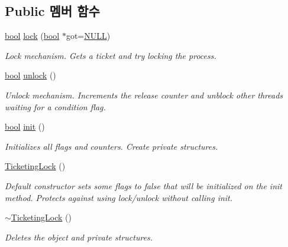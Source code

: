\subsection*{Public 멤버 함수}
\begin{DoxyCompactItemize}
\item 
\hyperlink{avb__gptp_8h_af6a258d8f3ee5206d682d799316314b1}{bool} \hyperlink{class_ticketing_lock_a27addfbd7031de7dc72d73e9e89449bd}{lock} (\hyperlink{avb__gptp_8h_af6a258d8f3ee5206d682d799316314b1}{bool} $\ast$got=\hyperlink{openavb__types__base__pub_8h_a070d2ce7b6bb7e5c05602aa8c308d0c4}{N\+U\+LL})
\begin{DoxyCompactList}\small\item\em Lock mechanism. Gets a ticket and try locking the process. \end{DoxyCompactList}\item 
\hyperlink{avb__gptp_8h_af6a258d8f3ee5206d682d799316314b1}{bool} \hyperlink{class_ticketing_lock_ae399421ee39cae4df5ea44bd21e31254}{unlock} ()
\begin{DoxyCompactList}\small\item\em Unlock mechanism. Increments the release counter and unblock other threads waiting for a condition flag. \end{DoxyCompactList}\item 
\hyperlink{avb__gptp_8h_af6a258d8f3ee5206d682d799316314b1}{bool} \hyperlink{class_ticketing_lock_aee8048628ff2b5c026c9e15acdcaacb8}{init} ()
\begin{DoxyCompactList}\small\item\em Initializes all flags and counters. Create private structures. \end{DoxyCompactList}\item 
\hyperlink{class_ticketing_lock_aab66d8231bd64c25c97d24bd01beb6cd}{Ticketing\+Lock} ()
\begin{DoxyCompactList}\small\item\em Default constructor sets some flags to false that will be initialized on the init method. Protects against using lock/unlock without calling init. \end{DoxyCompactList}\item 
\hyperlink{class_ticketing_lock_a0e1fa5f272a7acba554c73f821ccc1b7}{$\sim$\+Ticketing\+Lock} ()
\begin{DoxyCompactList}\small\item\em Deletes the object and private structures. \end{DoxyCompactList}\end{DoxyCompactItemize}
